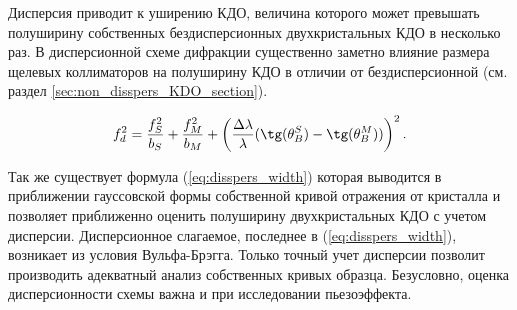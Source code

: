 Дисперсия приводит к уширению КДО, величина которого может превышать полуширину собственных бездисперсионных
двухкристальных КДО в несколько раз. В дисперсионной схеме дифракции существенно заметно
влияние размера щелевых коллиматоров на полуширину КДО в отличии от бездисперсионной (см. раздел \ref{sec:non_disspers_KDO_section}).

\begin{equation}
 f_d^2 = \frac{f_S^2}{b_S}+\frac{f_M^2}{b_M}+\left( \frac{\Delta \lambda}{\lambda} (\tg(\theta_B^S) - \tg(\theta_B^M)) \right)^2.
 \label{eq:disspers_width}
\end{equation}

Так же существует формула (\ref{eq:disspers_width}) \cite{lider2009} которая выводится в приближении
гауссовской формы собственной кривой отражения от кристалла и позволяет приближенно оценить
 полуширину двухкристальных КДО с учетом дисперсии. Дисперсионное слагаемое, последнее в (\ref{eq:disspers_width}),
 возникает из условия Вульфа-Брэгга. Только точный учет дисперсии позволит производить адекватный анализ собственных кривых образца.
 Безусловно, оценка дисперсионности схемы важна и при исследовании пьезоэффекта.
